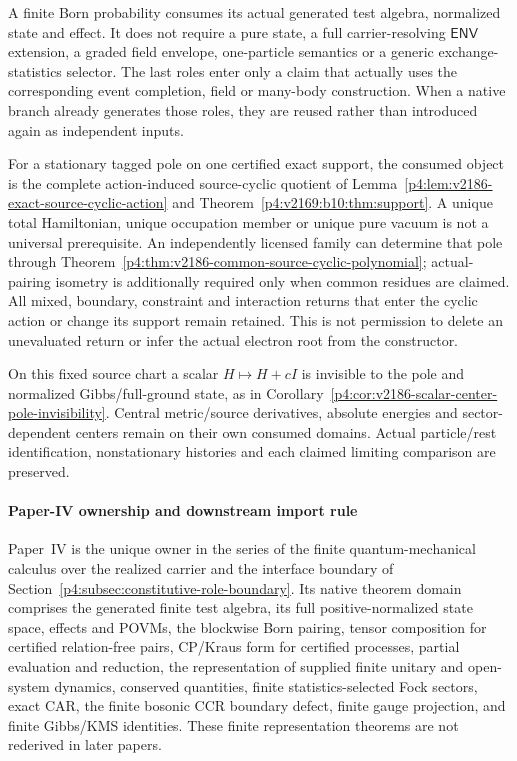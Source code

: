 \documentclass[12pt,a4paper]{article}
\begin{document}
\begin{remark}
\label{p4:rem:v2187-claim-relative-finite-prerequisites}
A finite Born probability consumes its actual generated test algebra,
normalized state and effect. It does not require a pure state, a full
carrier-resolving \(\mathsf{ENV}\) extension, a graded field envelope,
one-particle semantics or a generic exchange-statistics selector. The last
roles enter only a claim that actually uses the corresponding event completion,
field or many-body construction. When a native branch already generates those
roles, they are reused rather than introduced again as independent inputs.

For a stationary tagged pole on one certified exact support, the consumed
object is the complete action-induced source-cyclic quotient of
Lemma~\ref{p4:lem:v2186-exact-source-cyclic-action} and
Theorem~\ref{p4:v2169:b10:thm:support}. A unique total Hamiltonian, unique
occupation member or unique pure vacuum is not a universal prerequisite.
An independently licensed family can determine that pole through
Theorem~\ref{p4:thm:v2186-common-source-cyclic-polynomial}; actual-pairing
isometry is additionally required only when common residues are claimed.
All mixed, boundary, constraint and interaction returns that enter the cyclic
action or change its support remain retained. This is not permission to delete
an unevaluated return or infer the actual electron root from the constructor.

On this fixed source chart a scalar \(H\mapsto H+cI\) is invisible to the
pole and normalized Gibbs/full-ground state, as in
Corollary~\ref{p4:cor:v2186-scalar-center-pole-invisibility}. Central
metric/source derivatives, absolute energies and sector-dependent centers
remain on their own consumed domains. Actual particle/rest identification,
nonstationary histories and each claimed limiting comparison are preserved.
\end{remark}



\paragraph{Paper-IV ownership and downstream import rule}
\label{p4:subsec:quantum-ownership-rule}

Paper~IV is the unique owner in the series of the finite quantum-mechanical
calculus over the realized carrier and the interface boundary of
Section~\ref{p4:subsec:constitutive-role-boundary}.  Its native theorem domain
comprises the generated finite test algebra, its full positive-normalized
state space, effects and POVMs, the blockwise Born pairing, tensor composition
for certified relation-free pairs, CP/Kraus form for certified processes,
partial evaluation and reduction, the representation of supplied
finite unitary and open-system dynamics, conserved quantities, finite
statistics-selected Fock sectors, exact CAR, the finite bosonic CCR boundary
defect, finite gauge projection, and finite Gibbs/KMS identities.  These
finite representation theorems are not rederived in later papers.
\end{document}
